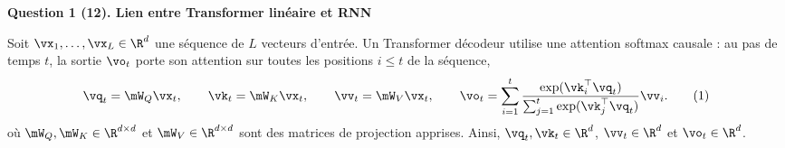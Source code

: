 \documentclass[12pt]{article}
\theoremstyle{definition}
\newcommand{\question}[2]{\par\medskip\noindent\textbf{Question #1. #2}\par\medskip}
\newcommand{\bos}{\texttt{<BOS>}}
\begin{document}


\question{1 (12)}{Lien entre Transformer linéaire et RNN}\label{ex:lstm}
Soit $\vx_1,\ldots,\vx_L\in\R^d$ une séquence de $L$ vecteurs d'entrée. Un Transformer décodeur utilise une attention softmax causale : au pas de temps $t$, la sortie $\vo_t$ porte son attention sur toutes les positions $i\le t$ de la séquence,
\begin{equation}
\vq_t=\mW_Q\vx_t,\qquad \vk_t=\mW_K\vx_t,\qquad \vv_t=\mW_V\vx_t,\qquad
 \vo_t=\sum_{i=1}^{t}\frac{\exp(\vk_i^\top \vq_t)}{\sum_{j=1}^{t}\exp(\vk_j^\top \vq_t)}\vv_i.
\tag{1}
\end{equation}
 où $\mW_Q,\mW_K\in\R^{d\times d}$ et $\mW_V\in\R^{d\times d}$ sont des matrices de projection apprises. Ainsi, $\vq_t,\vk_t\in\R^d$, $\vv_t\in\R^d$ et $\vo_t\in\R^d$.
\end{document}
